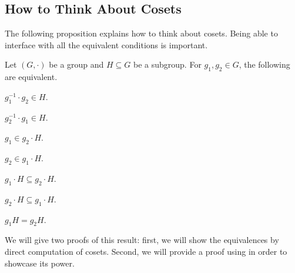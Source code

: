 \documentclass[../notes.tex]{subfiles}
\begin{document}
\subsection{How to Think About Cosets}
The following proposition explains how to think about cosets. Being able to interface with all the equivalent conditions is important.
\begin{proposition} \label{prop:how-to-coset}
    Let $(G,\cdot)$ be a group and $H\subseteq G$ be a subgroup. For $g_1,g_2\in G$, the following are equivalent.
    \begin{listalph}
        \item $g_1^{-1}\cdot g_2\in H$.
        \item $g_2^{-1}\cdot g_1\in H$.
        \item $g_1\in g_2\cdot H$.
        \item $g_2\in g_1\cdot H$.
        \item $g_1\cdot H\subseteq g_2\cdot H$.
        \item $g_2\cdot H\subseteq g_1\cdot H$.
        \item $g_1H=g_2H$.
    \end{listalph}
\end{proposition}
We will give two proofs of this result: first, we will show the equivalences by direct computation of cosets. Second, we will provide a proof using  in order to showcase its power.
\end{document}
